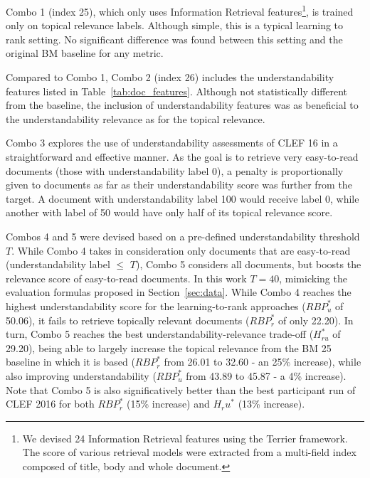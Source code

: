 Combo 1 (index 25), which only uses Information Retrieval features\footnote{We devised 24 Information Retrieval features using the Terrier framework. The score of various retrieval models were extracted from a multi-field index composed of title, body and whole document.}, is trained only on topical relevance labels. Although simple, this is a typical learning to rank setting.
No significant difference was found between this setting and the original BM baseline for any metric.

Compared to Combo 1, Combo 2 (index 26) includes the understandability features listed in Table~\ref{tab:doc_features}. Although not statistically different from the baseline, the inclusion of understandability features was as beneficial to the understandability relevance as for the topical relevance.

Combo 3 explores the use of understandability assessments of CLEF 16 in a straightforward and effective manner. As the goal is to retrieve very easy-to-read documents (those with understandability label 0), a penalty is proportionally given to documents as far as their understandability score was further from the target. A document with understandability label 100 would receive label 0, while another with label of 50 would have only half of its topical relevance score.

Combos 4 and 5 were devised based on a pre-defined understandability threshold $T$. While Combo 4 takes in consideration only documents that are easy-to-read (understandability label $\le$ $T$), Combo 5 considers all documents, but boosts the relevance score of easy-to-read documents. In this work $T=40$, mimicking the evaluation formulas proposed in Section~\ref{sec:data}. While Combo 4 reaches the highest understandability score for the learning-to-rank approaches ($RBP_u^{*}$ of 50.06), it fails to retrieve topically relevant documents ($RBP_r^{*}$ of only 22.20). In turn, Combo 5 reaches the best understandability-relevance trade-off ($H_{ru}^{*}$ of 29.20), being able to largely increase the topical relevance from the BM 25 baseline in which it is based ($RBP_r^*$ from 26.01 to 32.60 - an 25\% increase), while also improving understandability ($RBP_u^*$ from 43.89 to 45.87 - a 4\% increase). Note that Combo 5 is also significatively better than the best participant run of CLEF
2016 for both $RBP_r^{*}$ (15\% increase) and $H_ru^{*}$ (13\% increase).




